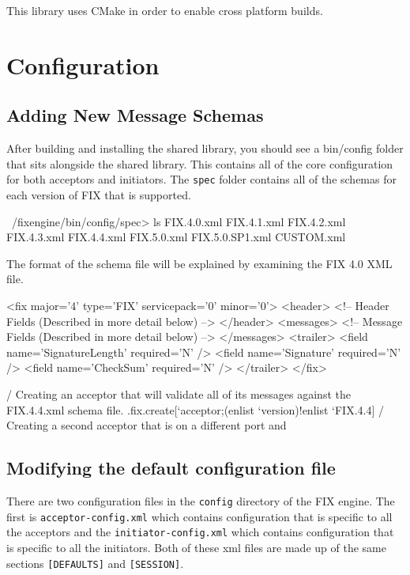 This library uses CMake in order to enable cross platform builds.

\section{Configuration}
\subsection{Adding New Message Schemas}

After building and installing the shared library, you should see a bin/config folder that sits
alongside the shared library. This contains all of the core configuration for both acceptors
and initiators. The \verb|spec| folder contains all of the schemas for each version of FIX that is
supported.

\begin{qcode}
~/fixengine/bin/config/spec> ls
FIX.4.0.xml
FIX.4.1.xml
FIX.4.2.xml
FIX.4.3.xml
FIX.4.4.xml
FIX.5.0.xml
FIX.5.0.SP1.xml
CUSTOM.xml
\end{qcode}

The format of the schema file will be explained by examining the FIX 4.0 XML file.

\begin{xmlcode}
<fix major='4' type='FIX' servicepack='0' minor='0'>
	<header>
		<!-- Header Fields (Described in more detail below) -->
	</header>
	<messages>
		<!-- Message Fields (Described in more detail below) -->
	</messages>
	<trailer>
		<field name='SignatureLength' required='N' />
		<field name='Signature' required='N' />
		<field name='CheckSum' required='N' />
	</trailer>
</fix>
\end{xmlcode}

\begin{qcode}
/ Creating an acceptor that will validate all of its messages against the FIX.4.4.xml schema file.
.fix.create[`acceptor;(enlist `version)!enlist `FIX.4.4]
/ Creating a second acceptor that is on a different port and 
\end{qcode}

\subsection{Modifying the default configuration file}
There are two configuration files in the \verb|config| directory of the FIX engine. The first
is \verb|acceptor-config.xml| which contains configuration that is specific to all the acceptors
and the \verb|initiator-config.xml| which contains configuration that is specific to all the initiators. Both of these xml files are made up of the same sections \verb|[DEFAULTS]| and \verb|[SESSION]|. 

